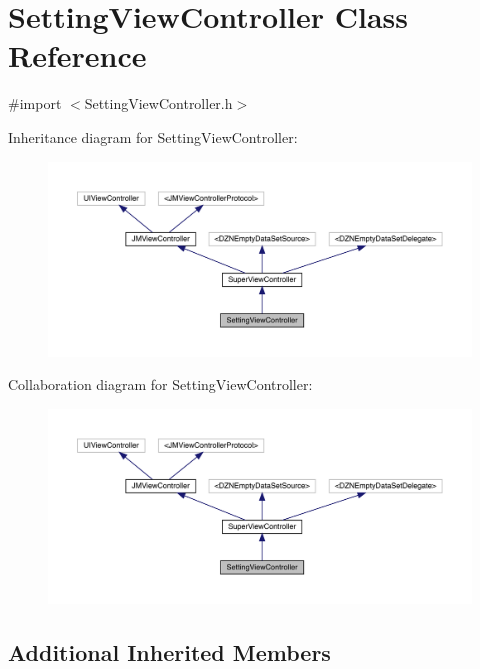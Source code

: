 \hypertarget{interface_setting_view_controller}{}\section{Setting\+View\+Controller Class Reference}
\label{interface_setting_view_controller}


{\ttfamily \#import $<$Setting\+View\+Controller.\+h$>$}



Inheritance diagram for Setting\+View\+Controller\+:\nopagebreak
\begin{figure}[H]
\begin{center}
\leavevmode
\includegraphics[width=350pt]{interface_setting_view_controller__inherit__graph}
\end{center}
\end{figure}


Collaboration diagram for Setting\+View\+Controller\+:\nopagebreak
\begin{figure}[H]
\begin{center}
\leavevmode
\includegraphics[width=350pt]{interface_setting_view_controller__coll__graph}
\end{center}
\end{figure}
\subsection*{Additional Inherited Members}


